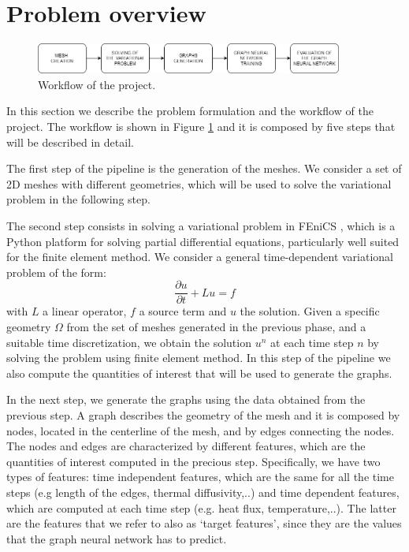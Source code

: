 \documentclass[11pt,a4paper]{article}
\begin{document}
\section{Problem overview}
\label{problem}

\begin{figure}[H]
    \centering
    \includegraphics[width=0.9\textwidth]{Images/schema.png}
    \caption{Workflow of the project.}
    \label{workflow}
\end{figure}

In this section we describe the problem formulation and the workflow of the project. The workflow is shown in Figure \ref{workflow} and it is composed by five steps that will be described in detail. 

The first step of the pipeline is the generation of the meshes. We consider a set of 2D meshes with different geometries, which will be used to solve the variational problem in the following step.

The second step consists in solving a variational problem in FEniCS \cite{FEniCS}, which is a Python platform for solving partial differential equations, particularly well suited for the finite element method.
We consider a general time-dependent variational problem of the form:
\[ \frac{\partial u}{\partial t} + Lu=f\]
with \(L\) a linear operator, \(f\) a source term and \(u\) the solution. Given a specific geometry \(\Omega\) from the set of meshes generated in the previous phase, and a suitable time discretization, we obtain the solution \(u^{n}\) at each time step \(n\) by solving the problem using finite element method. In this step of the pipeline we also compute the quantities of interest that will be used to generate the graphs. 

In the next step, we generate the graphs using the data obtained from the previous step. A graph describes the geometry of the mesh and it is composed by nodes, located in the centerline of the mesh, and by edges connecting the nodes. The nodes and edges are characterized by different features, which are the quantities of interest computed in the precious step. Specifically, we have two types of features: time independent features, which are the same for all the time steps (e.g length of the edges, thermal diffusivity,..) and time dependent features, which are computed at each time step (e.g. heat flux, temperature,..). The latter are the features that we refer to also as `target features', since they are the values that the graph neural network has to predict.
\end{document}
